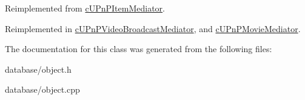 Reimplemented from \hyperlink{classcUPnPItemMediator_6d954b1cfdc4a7d55981c6ebff9d6d04}{cUPnPItemMediator}.

Reimplemented in \hyperlink{classcUPnPVideoBroadcastMediator_822f9c93928a7dbe9491c8cccbf53f95}{cUPnPVideoBroadcastMediator}, and \hyperlink{classcUPnPMovieMediator_61ab6dcaf2417898428ddf1f635788b7}{cUPnPMovieMediator}.

The documentation for this class was generated from the following files:\begin{CompactItemize}
\item 
database/object.h\item 
database/object.cpp\end{CompactItemize}

